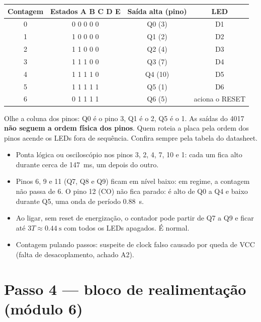 \documentclass[11pt,a4paper]{article}
\begin{document}
\begin{center}
\small
\begin{tabular}{@{}c c c c@{}}
\toprule
\textbf{Contagem} & \textbf{Estados A B C D E} & \textbf{Saída alta (pino)} & \textbf{LED} \\
\midrule
0 & 0 0 0 0 0 & Q0 (3) & D1 \\
1 & 1 0 0 0 0 & Q1 (2) & D2 \\
2 & 1 1 0 0 0 & Q2 (4) & D3 \\
3 & 1 1 1 0 0 & Q3 (7) & D4 \\
4 & 1 1 1 1 0 & Q4 (10) & D5 \\
5 & 1 1 1 1 1 & Q5 (1) & D6 \\
6 & 0 1 1 1 1 & Q6 (5) & aciona o RESET \\
\bottomrule
\end{tabular}
\end{center}

\begin{dicaprof}
Olhe a coluna dos pinos: Q0 é o pino 3, Q1 é o 2, Q5 é o 1. As saídas do 4017
\textbf{não seguem a ordem física dos pinos}. Quem roteia a placa pela ordem dos pinos
acende os LEDs fora de sequência. Confira sempre pela tabela do datasheet.
\end{dicaprof}

\begin{medir}
\begin{itemize}[leftmargin=*]
  \item Ponta lógica ou osciloscópio nos pinos 3, 2, 4, 7, 10 e 1: cada um fica alto
  durante cerca de \SI{147}{\milli\second}, um depois do outro.
  \item Pinos 6, 9 e 11 (Q7, Q8 e Q9) ficam em nível baixo: em regime, a contagem não
  passa de 6. O pino 12 (CO) não fica parado: é alto de Q0 a Q4 e baixo durante Q5, uma
  onda de período \SI{0,88}{\second}.
  \item Ao ligar, sem reset de energização, o contador pode partir de Q7 a Q9 e ficar até
  $3T \approx \SI{0,44}{\second}$ com todos os LEDs apagados. É normal.
  \item Contagem pulando passos: suspeite de clock falso causado por queda de VCC
  (falta de desacoplamento, achado A2).
\end{itemize}
\end{medir}

\section{Passo 4 — bloco de realimentação (módulo 6)}
\begin{figure}[H]
\centering
\diagramaBlocos[todosapagados, b4/.style={destaque}]
\end{figure}
\end{document}
